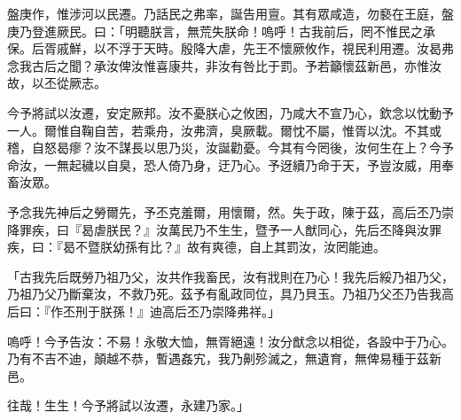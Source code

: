 
\begin{pinyinscope}
盤庚作，惟涉河以民遷。乃話民之弗率，誕告用亶。其有眾咸造，勿褻在王庭，盤庚乃登進厥民。曰：「明聽朕言，無荒失朕命！嗚呼！古我前后，罔不惟民之承保。后胥戚鮮，以不浮于天時。殷降大虐，先王不懷厥攸作，視民利用遷。汝曷弗念我古后之聞？承汝俾汝惟喜康共，非汝有咎比于罰。予若籲懷茲新邑，亦惟汝故，以丕從厥志。

今予將試以汝遷，安定厥邦。汝不憂朕心之攸困，乃咸大不宣乃心，欽念以忱動予一人。爾惟自鞠自苦，若乘舟，汝弗濟，臭厥載。爾忱不屬，惟胥以沈。不其或稽，自怒曷瘳？汝不謀長以思乃災，汝誕勸憂。今其有今罔後，汝何生在上？今予命汝，一無起穢以自臭，恐人倚乃身，迂乃心。予迓續乃命于天，予豈汝威，用奉畜汝眾。

予念我先神后之勞爾先，予丕克羞爾，用懷爾，然。失于政，陳于茲，高后丕乃崇降罪疾，曰『曷虐朕民？』汝萬民乃不生生，暨予一人猷同心，先后丕降與汝罪疾，曰：『曷不暨朕幼孫有比？』故有爽德，自上其罰汝，汝罔能迪。

「古我先后既勞乃祖乃父，汝共作我畜民，汝有戕則在乃心！我先后綏乃祖乃父，乃祖乃父乃斷棄汝，不救乃死。茲予有亂政同位，具乃貝玉。乃祖乃父丕乃告我高后曰：『作丕刑于朕孫！』迪高后丕乃崇降弗祥。」

嗚呼！今予告汝：不易！永敬大恤，無胥絕遠！汝分猷念以相從，各設中于乃心。乃有不吉不迪，顛越不恭，暫遇姦宄，我乃劓殄滅之，無遺育，無俾易種于茲新邑。

往哉！生生！今予將試以汝遷，永建乃家。」


\end{pinyinscope}